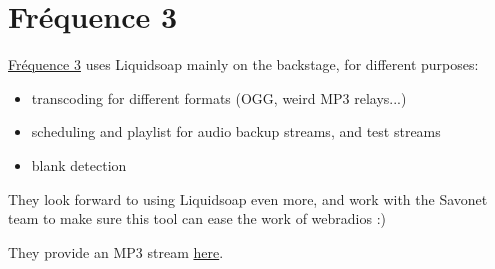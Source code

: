 \section{Fréquence 3}
\href{http://www.frequence3.fr}{Fréquence 3} uses Liquidsoap mainly on the backstage,
for different purposes:

\begin{itemize}
\item transcoding for different formats (OGG, weird MP3 relays...)
\item scheduling and playlist for audio backup streams, and test streams
\item blank detection

\end{itemize}
They look forward to using Liquidsoap even more, and work with the Savonet team
to make sure this tool can ease the work of webradios :)

They provide an MP3 stream \href{http://streams.frequence3.net/mp3-128.m3u}{here}.

